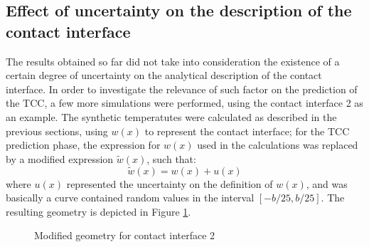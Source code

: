 \documentclass[12pt]{CHT-20}
\begin{document}
\subsection*{Effect of uncertainty on the description of the contact interface} The results obtained so far did not take into consideration the existence of a certain degree of uncertainty on the analytical description of the contact interface. In order to investigate the relevance of such factor on the prediction of the TCC, a few more simulations were performed, using the contact interface 2 as an example. The synthetic temperatutes were calculated as described in the previous sections, using $w(x)$ to represent the contact interface; for the TCC prediction phase, the expression for $w(x)$ used in the calculations was replaced by a modified expression $\tilde{w}(x)$, such that:
\begin{equation}
\tilde{w}(x) = w(x) + u(x)
\end{equation}
where $u(x)$ represented the uncertainty on the definition of $w(x)$, and was basically a curve contained random values in the interval $[-b/25, b/25]$. The resulting geometry is depicted in Figure \ref{fig3b_mod}.
\begin{figure}[H]
	\begin{center}
		\caption{Modified geometry for contact interface 2}
		\label{fig3b_mod}
	\end{center}
\end{figure}
\end{document}
